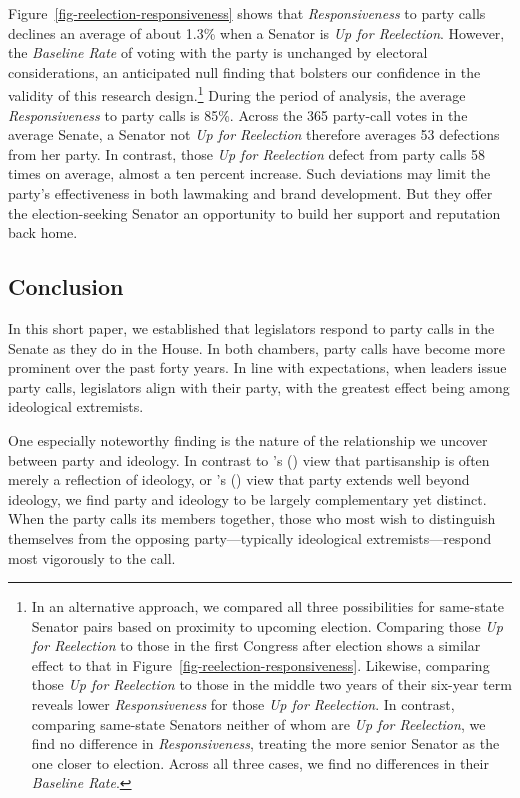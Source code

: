 \documentclass[12pt]{article}
\def\citeapos#1{\citeauthor{#1}'s (\citeyear{#1})} %
\begin{document}
Figure~\ref{fig-reelection-responsiveness} shows that \textit{Responsiveness} to party calls declines an average of about 1.3\% when a Senator is \textit{Up for Reelection}.  However, the \textit{Baseline Rate} of voting with the party is unchanged by electoral considerations,
an anticipated null finding that bolsters our confidence in the validity of this research design.\footnote{\doublespacing\normalsize  In an alternative approach, we compared all three possibilities for same-state Senator pairs based on proximity to upcoming election.  Comparing those \textit{Up for Reelection} to those in the first Congress after election shows a similar effect to that in Figure~\ref{fig-reelection-responsiveness}.  Likewise, comparing those \textit{Up for Reelection} to those in the middle two years of their six-year term reveals lower \textit{Responsiveness} for those \textit{Up for Reelection}.  In contrast, comparing same-state Senators neither of whom are \textit{Up for Reelection}, we find no difference in \textit{Responsiveness}, treating the more senior Senator as the one closer to election.  Across all three cases, we find no differences in their \textit{Baseline Rate}.}
During the period of analysis, the average \textit{Responsiveness} to party calls is 85\%. Across the 365 party-call votes in the average Senate, a Senator not \textit{Up for Reelection} therefore averages 53 defections from her party.  In contrast, those \textit{Up for Reelection} defect from party calls 58 times on average, almost a ten percent increase.  Such deviations may limit the party's effectiveness in both lawmaking and brand development.  But they offer the election-seeking Senator an opportunity to build her support and reputation back home.

\subsection*{Conclusion}

In this short paper, we established that legislators respond to party calls in the Senate as they do in the House. In both chambers, party calls have become more prominent over the past forty years.  In line with expectations, when leaders issue party calls, legislators align with their party, with the greatest effect being among ideological extremists.

One especially noteworthy finding is the nature of the relationship we uncover between party and ideology.  In contrast to \citeapos{Krehbiel:1993} view that partisanship is often merely a reflection of ideology, or \citeapos{Lee:2009} view that party extends well beyond ideology, we find party and ideology to be largely complementary yet distinct.  When the party calls its members together, those who most wish to distinguish themselves from the opposing party---typically ideological extremists---respond most vigorously to the call.
\end{document}

